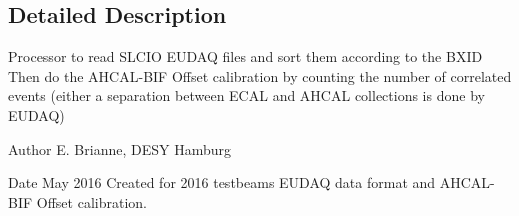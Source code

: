 \subsection{Detailed Description}
Processor to read S\-L\-C\-I\-O E\-U\-D\-A\-Q files and sort them according to the B\-X\-I\-D Then do the A\-H\-C\-A\-L-\/\-B\-I\-F Offset calibration by counting the number of correlated events (either a separation between E\-C\-A\-L and A\-H\-C\-A\-L collections is done by E\-U\-D\-A\-Q) \begin{DoxyAuthor}{Author}
E. Brianne, D\-E\-S\-Y Hamburg 
\end{DoxyAuthor}
\begin{DoxyDate}{Date}
May 2016 Created for 2016 testbeams E\-U\-D\-A\-Q data format and A\-H\-C\-A\-L-\/\-B\-I\-F Offset calibration. 
\end{DoxyDate}
